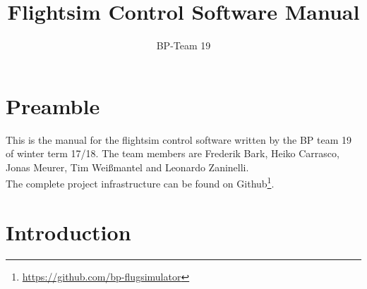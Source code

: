 \documentclass[accentcolor=tud1a, paper=a4, colorback]{tudreport}
\title{Flightsim Control Software Manual}
\subtitle{BP-Team 19}
\begin{document}
	\maketitle
	\tableofcontents

	\todototoc
	\listoftodos

	\chapter{Preamble}
	This is the manual for the flightsim control software written by the BP team 19
	of winter term 17/18. The team members are
	Frederik Bark, Heiko Carrasco, Jonas Meurer, Tim Weißmantel and Leonardo Zaninelli.
	\\
	The complete project infrastructure can be found on
	Github\footnote{\url{https://github.com/bp-flugsimulator}}.

	\chapter{Introduction}
\end{document}
